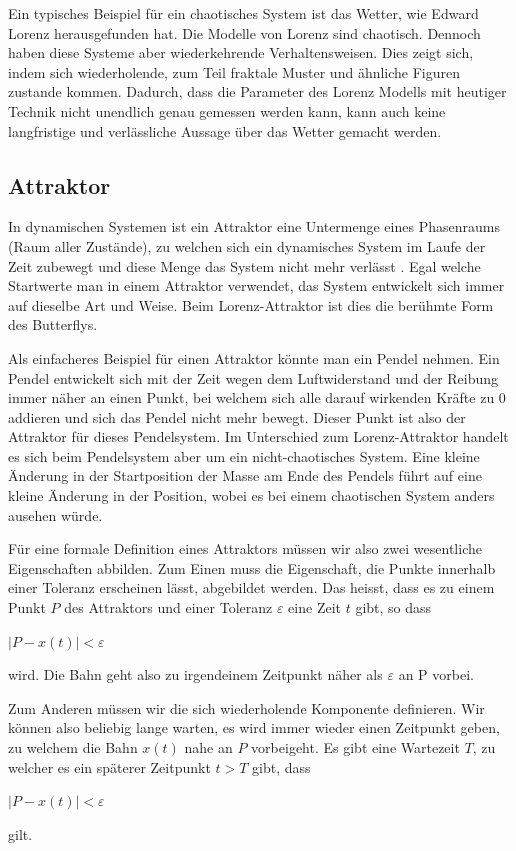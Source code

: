 Ein typisches Beispiel für ein chaotisches System ist das Wetter, wie Edward Lorenz herausgefunden hat. Die Modelle von Lorenz sind chaotisch. Dennoch haben diese Systeme aber	 wiederkehrende Verhaltensweisen. Dies zeigt sich, indem sich wiederholende, zum Teil fraktale Muster und ähnliche Figuren zustande kommen. Dadurch, dass die Parameter des Lorenz Modells mit heutiger Technik nicht unendlich genau gemessen werden kann, kann auch keine langfristige und verlässliche Aussage über das Wetter gemacht werden. 

\subsection{Attraktor}
In dynamischen Systemen ist ein Attraktor eine Untermenge eines Phasenraums (Raum aller Zustände), zu welchen sich ein dynamisches System im Laufe der Zeit zubewegt und diese Menge das System nicht mehr verlässt \cite{wikiattraktor}. 
Egal welche Startwerte man in einem Attraktor verwendet, das System entwickelt sich immer auf dieselbe Art und Weise. Beim Lorenz-Attraktor ist dies die berühmte Form des Butterflys. 

Als einfacheres Beispiel für einen Attraktor könnte man ein Pendel nehmen. Ein Pendel entwickelt sich mit der Zeit wegen dem Luftwiderstand und der Reibung immer näher an einen Punkt, bei welchem sich alle darauf wirkenden Kräfte zu $0$ addieren und sich das Pendel nicht mehr bewegt. Dieser Punkt ist also der Attraktor für dieses Pendelsystem. Im Unterschied zum Lorenz-Attraktor handelt es sich beim Pendelsystem aber um ein nicht-chaotisches System. Eine kleine Änderung in der Startposition der Masse am Ende des Pendels führt auf eine kleine Änderung in der Position, wobei es bei einem chaotischen System anders ausehen würde. 

Für eine formale Definition eines Attraktors müssen wir also zwei wesentliche Eigenschaften abbilden. Zum Einen muss die Eigenschaft, die Punkte innerhalb einer Toleranz erscheinen lässt, abgebildet werden. Das heisst, dass es zu einem Punkt $P$ des Attraktors  und einer Toleranz $\varepsilon$ eine Zeit $t$ gibt, so dass 

\begin{center}
	$|P - x(t)| < \varepsilon$
\end{center}
wird. Die Bahn geht also zu irgendeinem Zeitpunkt näher als $\varepsilon$ an P vorbei.

Zum Anderen müssen wir die sich wiederholende Komponente definieren. Wir können also beliebig lange warten, es wird immer wieder einen Zeitpunkt geben, zu welchem die Bahn $x(t)$ nahe an $P$ vorbeigeht. Es gibt eine Wartezeit $T$, zu welcher es ein späterer Zeitpunkt $t > T$ gibt, dass
\begin{center}
	$|P - x(t) |< \varepsilon$
\end{center}
gilt.

